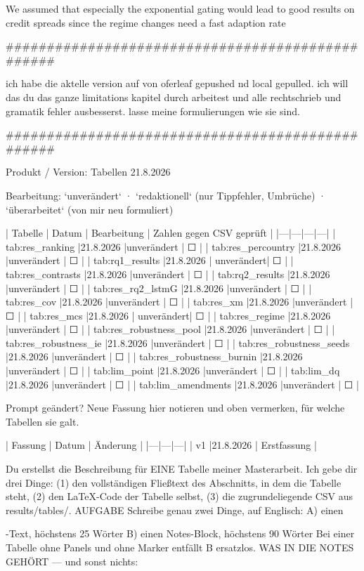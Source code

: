 We assumed that especially the exponential gating would lead to good results on credit spreads since the regime changes need a fast adaption rate

#################################################

ich habe die aktelle version auf von oferleaf gepushed nd local gepulled. ich will das du das ganze limitations kapitel durch arbeitest und alle rechtschrieb und gramatik fehler ausbesserst. lasse meine formulierungen wie sie sind.

#################################################

Produkt / Version: Tabellen 21.8.2026

Bearbeitung: `unverändert` · `redaktionell` (nur Tippfehler, Umbrüche) · `überarbeitet` (von mir neu formuliert)

| Tabelle | Datum | Bearbeitung | Zahlen gegen CSV geprüft |
|---|---|---|---|
| tab:res_ranking |21.8.2026 |unverändert | ☐ |
| tab:res_percountry |21.8.2026 |unverändert | ☐ |
| tab:rq1_results |21.8.2026 | unverändert| ☐ |
| tab:res_contrasts |21.8.2026 |unverändert | ☐ |
| tab:rq2_results |21.8.2026 |unverändert | ☐ |
| tab:res_rq2_lstmG |21.8.2026 |unverändert | ☐ |
| tab:res_cov |21.8.2026 |unverändert | ☐ |
| tab:res_xm |21.8.2026 |unverändert | ☐ |
| tab:res_mcs |21.8.2026 | unverändert| ☐ |
| tab:res_regime |21.8.2026 |unverändert | ☐ |
| tab:res_robustness_pool |21.8.2026 |unverändert | ☐ |
| tab:res_robustness_ie |21.8.2026 |unverändert | ☐ |
| tab:res_robustness_seeds |21.8.2026 |unverändert | ☐ |
| tab:res_robustness_burnin |21.8.2026 |unverändert | ☐ |
| tab:lim_point |21.8.2026 |unverändert | ☐ |
| tab:lim_dq |21.8.2026 |unverändert | ☐ |
| tab:lim_amendments |21.8.2026 |unverändert | ☐ |

Prompt geändert? Neue Fassung hier notieren und oben vermerken, für welche Tabellen sie galt.

| Fassung | Datum | Änderung |
|---|---|---|
| v1 |21.8.2026 | Erstfassung |


Du erstellst die Beschreibung für EINE Tabelle meiner Masterarbeit.
Ich gebe dir drei Dinge: (1) den vollständigen Fließtext des Abschnitts, in dem die Tabelle steht, (2) den LaTeX-Code der Tabelle selbst, (3) die zugrundeliegende CSV aus results/tables/.
AUFGABE Schreibe genau zwei Dinge, auf Englisch: A) einen \caption{}-Text, höchstens 25 Wörter B) einen Notes-Block, höchstens 90 Wörter Bei einer Tabelle ohne Panels und ohne Marker entfällt B ersatzlos.
WAS IN DIE NOTES GEHÖRT — und sonst nichts:

